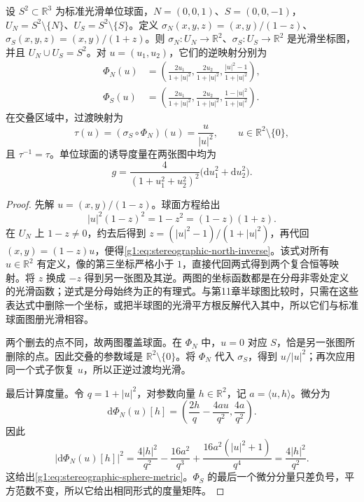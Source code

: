 \begin{proposition}
	\label{g1:prop:stereographic-chart-metric}
	设 \(S^2\subset\mathbb R^3\) 为标准光滑单位球面，\(N=(0,0,1)\)、\(S=(0,0,-1)\)，\(U_N=S^2\setminus\{N\}\)、\(U_S=S^2\setminus\{S\}\)。定义 \(\sigma_N(x,y,z)=(x,y)/(1-z)\)、\(\sigma_S(x,y,z)=(x,y)/(1+z)\)。则 \(\sigma_N:U_N\to\mathbb R^2\)、\(\sigma_S:U_S\to\mathbb R^2\) 是光滑坐标图，并且 \(U_N\cup U_S=S^2\)。对 \(u=(u_1,u_2)\)，它们的逆映射分别为
	\begin{align}
		\Phi_N(u)&=\left(\frac{2u_1}{1+|u|^2},\frac{2u_2}{1+|u|^2},\frac{|u|^2-1}{1+|u|^2}\right),
		\label{g1:eq:stereographic-north-inverse}\\
		\Phi_S(u)&=\left(\frac{2u_1}{1+|u|^2},\frac{2u_2}{1+|u|^2},\frac{1-|u|^2}{1+|u|^2}\right).
		\label{g1:eq:stereographic-south-inverse}
	\end{align}
	在交叠区域中，过渡映射为
	\begin{equation}
		\label{g1:eq:stereographic-real-transition}
		\tau(u)=(\sigma_S\circ\Phi_N)(u)=\frac{u}{|u|^2},
		\qquad u\in\mathbb R^2\setminus\{0\},
	\end{equation}
	且 \(\tau^{-1}=\tau\)。单位球面的诱导度量在两张图中均为
	\begin{equation}
		\label{g1:eq:stereographic-sphere-metric}
		g=\frac{4}{(1+u_1^2+u_2^2)^2}
		\bigl(\mathrm{d}u_1^2+\mathrm{d}u_2^2\bigr).
	\end{equation}
\end{proposition}
\begin{proof}
	先解 \(u=(x,y)/(1-z)\)。球面方程给出
	\[
		|u|^2(1-z)^2=1-z^2=(1-z)(1+z).
	\]
	在 \(U_N\) 上 \(1-z\ne0\)，约去后得到 \(z=(|u|^2-1)/(1+|u|^2)\)，再代回 \((x,y)=(1-z)u\)，便得\eqref{g1:eq:stereographic-north-inverse}。该式对所有 \(u\in\mathbb R^2\) 有定义，像的第三坐标严格小于 \(1\)，直接代回两式得到两个复合恒等映射。将 \(z\) 换成 \(-z\) 得到另一张图及其逆。两图的坐标函数都是在分母非零处定义的光滑函数；逆式是分母始终为正的有理式。与第11章半球图比较时，只需在这些表达式中删除一个坐标，或把半球图的光滑平方根反解代入其中，所以它们与标准球面图册光滑相容。

	两个删去的点不同，故两图覆盖球面。在 \(\Phi_N\) 中，\(u=0\) 对应 \(S\)，恰是另一张图所删除的点。因此交叠的参数域是 \(\mathbb R^2\setminus\{0\}\)。将 \(\Phi_N\) 代入 \(\sigma_S\)，得到 \(u/|u|^2\)；再次应用同一个式子恢复 \(u\)，所以正逆过渡均光滑。

	最后计算度量。令 \(q=1+|u|^2\)，对参数向量 \(h\in\mathbb R^2\)，记 \(a=\langle u,h\rangle\)。微分为
	\[
		\mathrm{d}\Phi_N(u)[h]
		=\left(\frac{2h}{q}-\frac{4au}{q^2},\frac{4a}{q^2}\right).
	\]
	因此
	\[
		\left|\mathrm{d}\Phi_N(u)[h]\right|^2
		=\frac{4|h|^2}{q^2}-\frac{16a^2}{q^3}
		+\frac{16a^2(|u|^2+1)}{q^4}
		=\frac{4|h|^2}{q^2}.
	\]
	这给出\eqref{g1:eq:stereographic-sphere-metric}。\(\Phi_S\) 的最后一个微分分量只差负号，平方范数不变，所以它给出相同形式的度量矩阵。
\end{proof}

